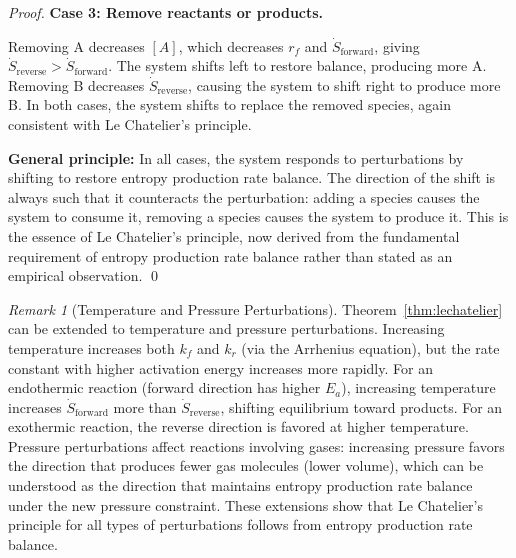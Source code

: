 \documentclass[12pt,a4paper]{article}
\theoremstyle{definition}
\theoremstyle{remark}
\newtheorem{remark}[theorem]{Remark}
\begin{document}
\begin{proof}
\textbf{Case 3: Remove reactants or products.}

Removing A decreases $[A]$, which decreases $r_f$ and $\dot{S}_{\text{forward}}$, giving $\dot{S}_{\text{reverse}} > \dot{S}_{\text{forward}}$. The system shifts left to restore balance, producing more A. Removing B decreases $\dot{S}_{\text{reverse}}$, causing the system to shift right to produce more B. In both cases, the system shifts to replace the removed species, again consistent with Le Chatelier's principle.

\textbf{General principle:}
In all cases, the system responds to perturbations by shifting to restore entropy production rate balance. The direction of the shift is always such that it counteracts the perturbation: adding a species causes the system to consume it, removing a species causes the system to produce it. This is the essence of Le Chatelier's principle, now derived from the fundamental requirement of entropy production rate balance rather than stated as an empirical observation. \qed
\end{proof}

\begin{remark}[Temperature and Pressure Perturbations]
\label{rem:temperature_pressure}
Theorem~\ref{thm:lechatelier} can be extended to temperature and pressure perturbations. Increasing temperature increases both $k_f$ and $k_r$ (via the Arrhenius equation), but the rate constant with higher activation energy increases more rapidly. For an endothermic reaction (forward direction has higher $E_a$), increasing temperature increases $\dot{S}_{\text{forward}}$ more than $\dot{S}_{\text{reverse}}$, shifting equilibrium toward products. For an exothermic reaction, the reverse direction is favored at higher temperature. Pressure perturbations affect reactions involving gases: increasing pressure favors the direction that produces fewer gas molecules (lower volume), which can be understood as the direction that maintains entropy production rate balance under the new pressure constraint. These extensions show that Le Chatelier's principle for all types of perturbations follows from entropy production rate balance.
\end{remark}
\end{document}
